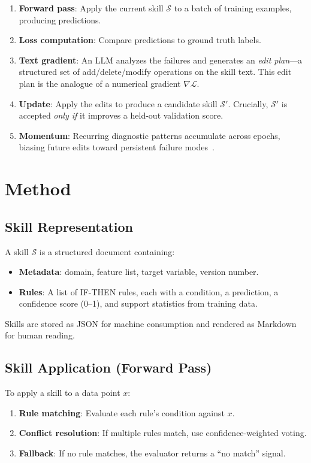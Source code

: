 \documentclass{article}
\begin{document}
\begin{enumerate}
    \item \textbf{Forward pass}: Apply the current skill $\mathcal{S}$ to a batch of training examples, producing predictions.
    \item \textbf{Loss computation}: Compare predictions to ground truth labels.
    \item \textbf{Text gradient}: An LLM analyzes the failures and generates an \emph{edit plan}---a structured set of add/delete/modify operations on the skill text. This edit plan is the analogue of a numerical gradient $\nabla \mathcal{L}$.
    \item \textbf{Update}: Apply the edits to produce a candidate skill $\mathcal{S}'$. Crucially, $\mathcal{S}'$ is accepted \emph{only if} it improves a held-out validation score.
    \item \textbf{Momentum}: Recurring diagnostic patterns accumulate across epochs, biasing future edits toward persistent failure modes~\cite{skillgrad2026}.
\end{enumerate}

\section{Method}

\subsection{Skill Representation}

A skill $\mathcal{S}$ is a structured document containing:
\begin{itemize}
    \item \textbf{Metadata}: domain, feature list, target variable, version number.
    \item \textbf{Rules}: A list of IF-THEN rules, each with a condition, a prediction, a confidence score (0--1), and support statistics from training data.
\end{itemize}
Skills are stored as JSON for machine consumption and rendered as Markdown for human reading.

\subsection{Skill Application (Forward Pass)}

To apply a skill to a data point $x$:
\begin{enumerate}
    \item \textbf{Rule matching}: Evaluate each rule's condition against $x$.
    \item \textbf{Conflict resolution}: If multiple rules match, use confidence-weighted voting.
    \item \textbf{Fallback}: If no rule matches, the evaluator returns a ``no match'' signal.
\end{enumerate}
\end{document}
